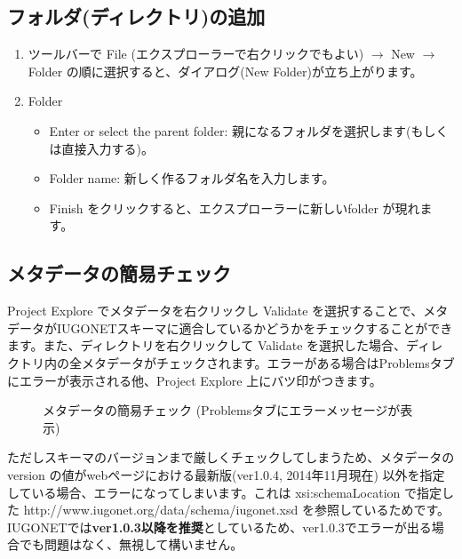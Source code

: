 \subsection{フォルダ(ディレクトリ)の追加}
\begin{enumerate}
\item ツールバーで \colorbox[gray]{0.8}{File} (エクスプローラーで右クリックでもよい) $\rightarrow$ 
\colorbox[gray]{0.8}{New} $\rightarrow$ \colorbox[gray]{0.8}{Folder}
の順に選択すると、ダイアログ(New Folder)が立ち上がります。
\item Folder
\begin{itemize}
\item Enter or select the parent folder: 親になるフォルダを選択します(もしくは直接入力する)。
\item Folder name: 新しく作るフォルダ名を入力します。
\item Finish をクリックすると、エクスプローラーに新しいfolder が現れます。
\end{itemize}
\end{enumerate}

\subsection{メタデータの簡易チェック}
Project Explore でメタデータを右クリックし \colorbox[gray]{0.8}{Validate} を選択することで、メタデータがIUGONETスキーマに適合しているかどうかをチェックすることができます。また、ディレクトリを右クリックして \colorbox[gray]{0.8}{Validate} を選択した場合、ディレクトリ内の全メタデータがチェックされます。エラーがある場合はProblemsタブにエラーが表示される他、Project Explore 上にバツ印がつきます。

\begin{figure}[H]
\begin{center}
\caption{メタデータの簡易チェック (Problemsタブにエラーメッセージが表示) }
\label{IugonetMetadataEditor4}
\end{center}
\end{figure}

ただしスキーマのバージョンまで厳しくチェックしてしまうため、メタデータの version の値がwebページにおける最新版(ver1.0.4, 2014年11月現在) 以外を指定している場合、エラーになってしまいます。これは xsi:schemaLocation で指定した http://www.iugonet.org/data/schema/iugonet.xsd を参照しているためです。IUGONETでは{\bf ver1.0.3以降を推奨}としているため、ver1.0.3でエラーが出る場合でも問題はなく、無視して構いません。




